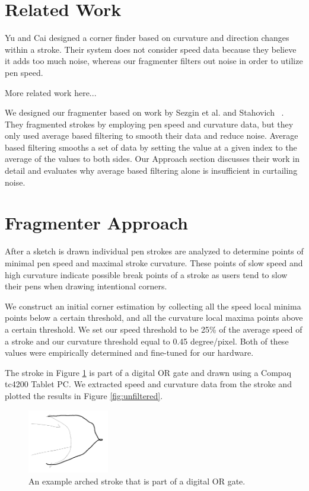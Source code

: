 \documentclass[10pt]{acmsiggraph}          %
\begin{document}
\section{Related Work}

Yu and Cai  designed a corner finder based on curvature and direction changes within a stroke. Their system does not consider speed data because they believe it adds too much noise, whereas our fragmenter filters out noise in order to utilize pen speed.

More related work here...

We designed our fragmenter based on work by Sezgin et al. and Stahovich ~. They fragmented strokes by employing pen speed and curvature data, but
they only used average based filtering to smooth their data and reduce noise. Average based filtering smooths a set of data by setting the value at a given index to the average of the values to both sides. Our Approach section discusses their work in detail and evaluates why average based filtering alone is insufficient in curtailing noise.


\section{Fragmenter Approach}

After a sketch is drawn individual pen strokes are analyzed to determine points of minimal pen speed and maximal stroke curvature. These points of 
slow speed and high curvature indicate possible break points of a stroke as users tend to slow their pens when drawing intentional corners.

We construct an initial corner estimation by collecting all the speed local minima points below a certain threshold, and all the curvature local maxima 
points above a certain threshold. We set our speed threshold to be 25\% of the average speed of a stroke and our curvature threshold equal to 0.45 degree/pixel. 
Both of these values were empirically determined and fine-tuned for our hardware.

The stroke in Figure \ref{fig:stroke_example} is part of a digital OR gate and drawn using a Compaq tc4200 Tablet PC.  We extracted speed and curvature data from the stroke and plotted the results in Figure \ref{fig:unfiltered}. %

\begin{figure}[t]
  \centering
  \includegraphics[width=1.4in]{stroke_example_traced.png}
  \caption{An example arched stroke that is part of a digital OR gate.}
  \label{fig:stroke_example}
\end{figure}
\end{document}
